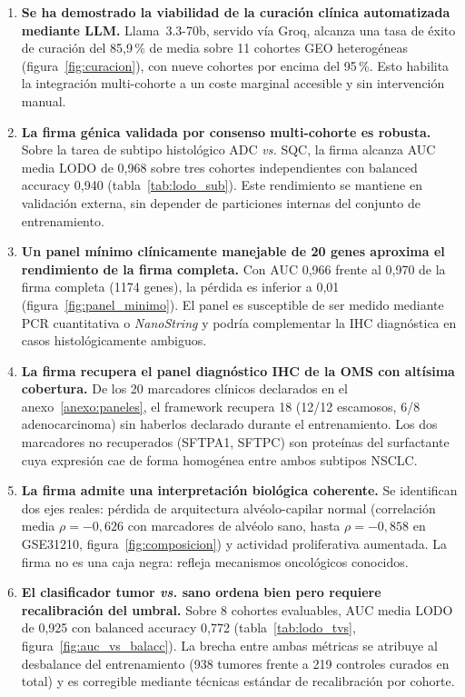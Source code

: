\begin{enumerate}
  \item \textbf{Se ha demostrado la viabilidad de la curación clínica
  automatizada mediante LLM.} Llama~3.3-70b, servido vía Groq, alcanza
  una tasa de éxito de curación del 85,9\,\% de media sobre 11 cohortes
  GEO heterogéneas (figura~\ref{fig:curacion}), con nueve cohortes por
  encima del 95\,\%. Esto habilita la integración multi-cohorte a un
  coste marginal accesible y sin intervención manual.

  \item \textbf{La firma génica validada por consenso multi-cohorte es
  robusta.} Sobre la tarea de subtipo histológico ADC \emph{vs.} SQC, la
  firma alcanza AUC media LODO de 0,968 sobre tres cohortes
  independientes con balanced accuracy 0,940 (tabla~\ref{tab:lodo_sub}).
  Este rendimiento se mantiene en validación externa, sin depender de
  particiones internas del conjunto de entrenamiento.

  \item \textbf{Un panel mínimo clínicamente manejable de 20 genes
  aproxima el rendimiento de la firma completa.} Con AUC 0,966 frente al
  0,970 de la firma completa (1174 genes), la pérdida es inferior a
  0,01 (figura~\ref{fig:panel_minimo}). El panel es susceptible de ser
  medido mediante PCR cuantitativa o \emph{NanoString} y podría
  complementar la IHC diagnóstica en casos histológicamente ambiguos.

  \item \textbf{La firma recupera el panel diagnóstico IHC de la OMS
  con altísima cobertura.} De los 20 marcadores clínicos declarados en
  el anexo~\ref{anexo:paneles}, el framework recupera 18 (12/12
  escamosos, 6/8 adenocarcinoma) sin haberlos declarado durante el
  entrenamiento. Los dos marcadores no recuperados (SFTPA1, SFTPC) son
  proteínas del surfactante cuya expresión cae de forma homogénea entre
  ambos subtipos NSCLC.

  \item \textbf{La firma admite una interpretación biológica coherente.}
  Se identifican dos ejes reales: pérdida de arquitectura alvéolo-capilar
  normal (correlación media $\rho=-0{,}626$ con marcadores de alvéolo
  sano, hasta $\rho=-0{,}858$ en GSE31210, figura~\ref{fig:composicion})
  y actividad proliferativa aumentada. La firma no es una caja negra:
  refleja mecanismos oncológicos conocidos.

  \item \textbf{El clasificador tumor \emph{vs.} sano ordena bien pero
  requiere recalibración del umbral.} Sobre 8 cohortes evaluables, AUC
  media LODO de 0,925 con balanced accuracy 0,772
  (tabla~\ref{tab:lodo_tvs}, figura~\ref{fig:auc_vs_balacc}). La brecha
  entre ambas métricas se atribuye al desbalance del entrenamiento (938
  tumores frente a 219 controles curados en total) y es corregible
  mediante técnicas estándar de recalibración por cohorte.


\end{enumerate}
